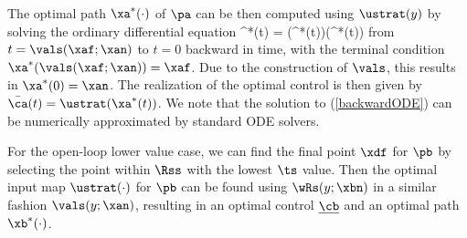 The optimal path $\xa^*(\cdot)$ of $\pa$ can be then computed using $\ustrat(y)$ by solving the ordinary differential equation
\vspace{-0.2cm}
\bq\label{backwardODE}
\dotxa^*(t) = \fa(\xa^*(t))\ustrat(\xa^*(t))
\eq
from $t=\vals(\xaf;\xan)$ to $t=0$ backward in time, with the terminal condition $\xa^*(\vals(\xaf;\xan))=\xaf$. 
Due to the construction of $\vals$, this results in $\xa^*(0)=\xan$.  
The realization of the optimal control is then given by $\bar\ca(t) = \ustrat(\xa^*(t))$.
We note that the solution to (\ref{backwardODE}) can be numerically approximated by standard ODE solvers.


For the open-loop lower value case, we can find the final point $\xdf$ for $\pb$ by selecting the point within $\Rss$ with the lowest $\ts$ value.
Then the optimal input map $\ustrat(\cdot)$ for $\pb$ can be found using $\wRs(y;\xbn)$ in a similar fashion $\vals(y;\xan)$, resulting in an optimal control $\underline{\cb}$ and an optimal path $\xb^*(\cdot)$. 

%
  

